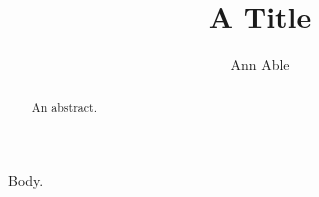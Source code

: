 \documentclass{gtpart}
\title{A Title}
\author{Ann Able}
\begin{document}
\begin{abstract}
An abstract.
\end{abstract}
\maketitle
Body.
\end{document}
